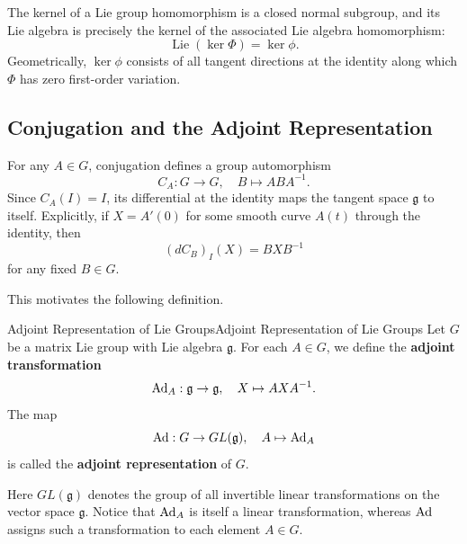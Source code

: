 \documentclass[../main.tex]{subfiles}
\begin{document}
\begin{remark}
  The kernel of a Lie group homomorphism is a closed normal subgroup, and its Lie algebra is precisely the kernel of the associated Lie algebra homomorphism:
  \begin{equation}
    \operatorname{Lie}(\ker\Phi)=\ker\phi.
  \end{equation}
  Geometrically, $\ker\phi$ consists of all tangent directions at the identity along which $\Phi$ has zero first-order variation.
\end{remark}

\subsection{Conjugation and the Adjoint Representation}

For any $A\in G$, conjugation defines a group automorphism
\begin{equation}
  C_A:G\to G,\quad B\mapsto ABA^{-1}.
\end{equation}
Since $C_A(I)=I$, its differential at the identity maps the tangent space $\mathfrak{g}$ to itself. Explicitly, if $X=A'(0)$ for some smooth curve $A(t)$ through the identity, then
\begin{equation}
  (dC_B)_I(X)=BXB^{-1}
\end{equation}
for any fixed $B\in G$.

This motivates the following definition.

\begin{definition}{Adjoint Representation of Lie Groups}{Adjoint Representation of Lie Groups}
  Let $G$ be a matrix Lie group with Lie algebra $\mathfrak{g}$. For each $A\in G$, we define the \textbf{adjoint transformation}
  \begin{equation}
    \operatorname{Ad}_A:\mathfrak{g}\to\mathfrak{g},
    \quad X\mapsto AXA^{-1}.
  \end{equation}
  The map
  \begin{equation}
    \operatorname{Ad}:G\to GL(\mathfrak{g}),
    \quad A\mapsto\operatorname{Ad}_A
  \end{equation}
  is called the \textbf{adjoint representation} of $G$.
\end{definition}

Here $GL(\mathfrak{g})$ denotes the group of all invertible linear transformations on the vector space $\mathfrak{g}$. Notice that $\operatorname{Ad}_A$ is itself a linear transformation, whereas $\operatorname{Ad}$ assigns such a transformation to each element $A\in G$.
\end{document}

